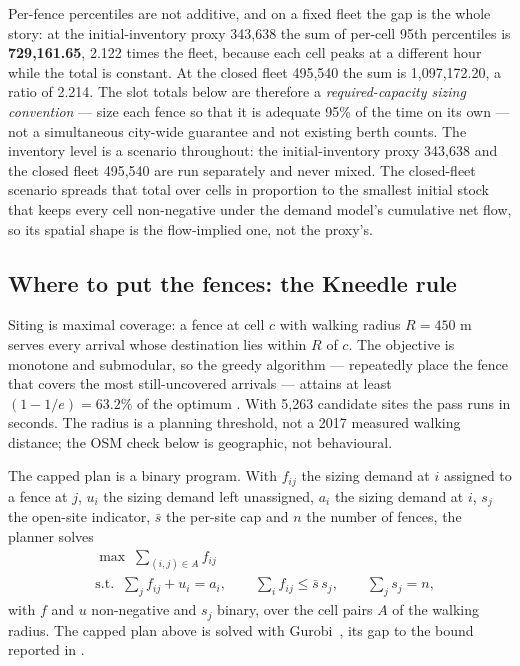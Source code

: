 Per-fence percentiles are not additive, and on a fixed fleet the gap is the whole story:
at the initial-inventory proxy 343,638 the sum of per-cell 95th percentiles is
\textbf{729,161.65}, 2.122 times the fleet, because each cell peaks at a different hour
while the total is constant. At the closed fleet 495,540 the sum is 1,097,172.20, a ratio
of 2.214. The slot totals below are therefore a \emph{required-capacity sizing convention}
--- size each fence so that it is adequate 95\% of the time on its own --- not a
simultaneous city-wide guarantee and not existing berth counts. The inventory level is a
scenario throughout: the initial-inventory proxy 343,638 and the closed fleet 495,540 are
run separately and never mixed. The closed-fleet scenario spreads that total over cells
in proportion to the smallest initial stock that keeps every cell non-negative under the
demand model's cumulative net flow, so its spatial shape is the flow-implied one, not the
proxy's.

\subsection{Where to put the fences: the Kneedle rule}

Siting is maximal coverage: a fence at cell $c$ with walking radius $R=450$ m serves
every arrival whose destination lies within $R$ of $c$. The objective is monotone and submodular,
so the greedy algorithm --- repeatedly place the fence that covers the most
still-uncovered arrivals --- attains at least $(1-1/e)=63.2\%$ of the optimum
\cite{nemhauser1978}. With 5,263 candidate sites the pass runs in seconds.
The radius is a planning threshold, not a 2017 measured walking distance; the OSM
check below is geographic, not behavioural.

The capped plan is a binary program. With $f_{ij}$ the sizing demand at $i$
assigned to a fence at $j$, $u_i$ the sizing demand left unassigned, $a_i$ the
sizing demand at $i$, $s_j$ the open-site indicator, $\bar s$ the per-site cap and $n$ the number
of fences, the planner solves
\begin{equation}
\begin{aligned}
&\max\;\sum_{(i,j)\in A}f_{ij}\\
&\text{s.t.}\;\;\sum_j f_{ij}+u_i=a_i,\qquad
\sum_i f_{ij}\le\bar s\,s_j,\qquad
\sum_j s_j=n ,
\end{aligned}
\label{eq:q4cap}
\end{equation}
with $f$ and $u$ non-negative and $s_j$ binary, over the cell pairs $A$ of the walking
radius. The capped plan above is solved with Gurobi~\cite{gurobi}, its gap to the bound
reported in .

